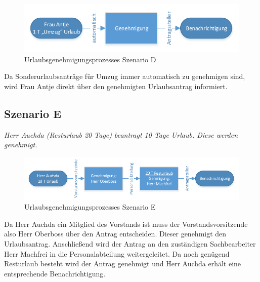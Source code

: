 \begin{figure}[H]
\centering
\includegraphics[width=0.75\linewidth]{Bilder/BeispielD}
\caption{Urlaubsgenehmigungsprozesses Szenario D}
\label{fig:BeispielD}
\end{figure}

Da Sonderurlaubsanträge für Umzug immer automatisch zu genehmigen sind, wird Frau Antje direkt über den genehmigten Urlaubsantrag informiert.

\subsection{Szenario E}
\textit{Herr Auchda (Resturlaub 20 Tage) beantragt 10 Tage Urlaub. Diese werden genehmigt.}

\begin{figure}[H]
\centering
\includegraphics[width=1.0\linewidth]{Bilder/BeispielE}
\caption{Urlaubsgenehmigungsprozesses Szenario E}
\label{fig:BeispielE}
\end{figure}

Da Herr Auchda ein Mitglied des Vorstands ist muss der Vorstandsvorsitzende also Herr Oberboss über den Antrag entscheiden. Dieser genehmigt den Urlaubsantrag. Anschließend wird der Antrag an den zuständigen Sachbearbeiter Herr Machfrei in die Personalabteilung weitergeleitet. Da noch genügend Resturlaub besteht wird der Antrag genehmigt und Herr Auchda erhält eine entsprechende Benachrichtigung.
